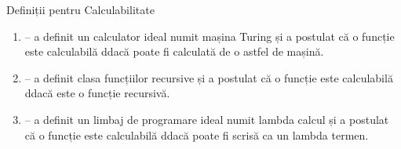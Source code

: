\documentclass[xcolor=pdftex,romanian,colorlinks]{beamer}
\begin{document}
\begin{frame}{Definiții pentru Calculabilitate}

\begin{enumerate}
	\item {} -- a definit un calculator ideal numit \alert{mașina Turing} și a postulat că o funcție este calculabilă ddacă poate fi calculată de o astfel de mașină.
	\medskip
	\item {} -- a definit clasa \alert{funcțiilor recursive} și a postulat că o funcție este calculabilă ddacă este o funcție recursivă.
	\medskip
	\item {} -- a definit un limbaj de programare ideal numit \alert{lambda calcul} și a postulat că o funcție este calculabilă ddacă poate fi scrisă ca un lambda termen.
\end{enumerate}

\end{frame}
\end{document}
